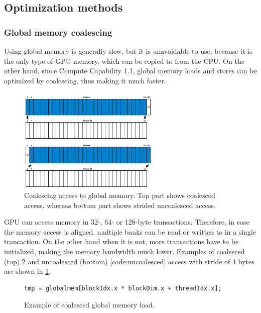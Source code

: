 \subsection{Optimization methods}\label{subsec:optimization}

\subsubsection{Global memory coalescing}\label{subsubsec:coalescing}

Using global memory is generally slow, but it is unavoidable to use, because it is the only type of GPU memory, which can be copied to from the CPU. On the other hand, since Compute Capability 1.1, global memory loads and stores can be optimized by coalescing, thus making it much faster.

\begin{center}
\begin{figure}[h]
	\centering\includegraphics[width=0.6\textwidth]{fig/coalescing.png}
	\caption{Coalescing access to global memory. Top part shows coalesced access, whereas bottom part shows strided uncoalesced access.}\label{fig:coalescing}
\end{figure}
\end{center}

GPU can access memory in 32-, 64- or 128-byte transactions. Therefore, in case the memory access is aligned, multiple banks can be read or written to in a single transaction. On the other hand when it is not, more transactions have to be initialized, making the memory bandwidth much lower. Examples of coalesced (top) \ref{code:coalesced} and uncoalesced (bottom) \ref{code:uncoalesced} access with stride of 4 bytes are shown in \ref{fig:coalescing}.

\begin{figure}[h]
\begin{verbatim}
tmp = globalmem[blockIdx.x * blockDim.x + threadIdx.x];
\end{verbatim}
\caption{Example of coalesced global memory load.}\label{code:coalesced}
\end{figure}

